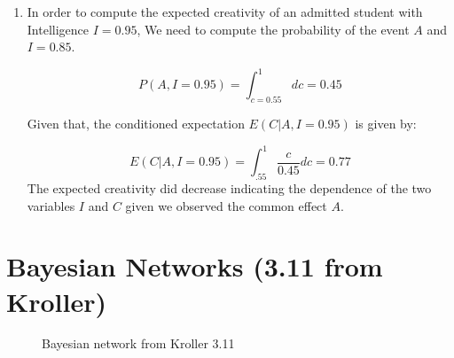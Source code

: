 \documentclass[10pt]{article}
\begin{document}
\begin{enumerate}[label=(\alph*)]
\item In order to compute the  expected creativity of an admitted student with
  Intelligence $I=0.95$, We need to compute the probability of the event $A$
  and $I=0.85$.

  \begin{equation}
    P(A, I=0.95) = \int_{c=0.55}^1 dc = 0.45
  \end{equation}


Given that, the conditioned expectation $E(C|A, I=0.95)$ is given by:

\begin{equation}
  E(C|A, I=0.95) = \int_{.55}^1 \dfrac{c}{0.45}dc=\mathbf{0.77}
\end{equation}
The expected creativity did decrease indicating the dependence of the two
variables $I$ and $C$ given we observed the common effect $A$.
\end{enumerate}
\section{Bayesian Networks (3.11 from Kroller)}%
\label{sec:bayesian_networks}
\begin{figure}[ht!]
\begin{center}
\end{center}
\caption{Bayesian network from Kroller 3.11}%
\label{fig:bayesian_network}
\end{figure}
\end{document}
